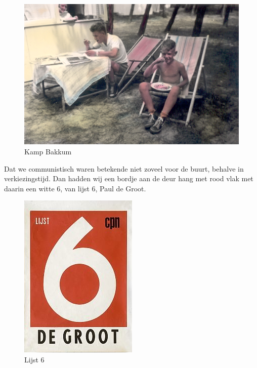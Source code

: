 \documentclass[12pt,twoside]{memoir}
\begin{document}
\begin{figure}
\includegraphics[width=\textwidth]{img/ch5/Bakkum2}
\caption*{\footnotesize Kamp Bakkum}
\end{figure} 

Dat we communistisch waren betekende niet zoveel voor de buurt, behalve in verkiezingstijd. Dan hadden wij een bordje aan de deur hang met rood vlak met daarin een witte 6, van lijst 6, Paul de Groot. 

\begin{figure}
\includegraphics[width=\textwidth]{img/ch5/cpn}
\caption*{\footnotesize Lijst 6}
\end{figure} 
\end{document}
